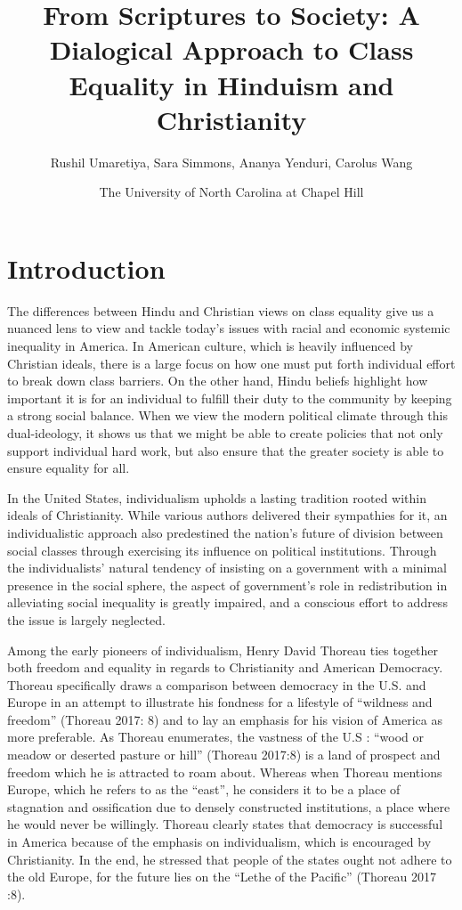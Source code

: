 \documentclass[
	letterpaper, %
	10pt, %
	unnumberedsections, %
	twoside, %
]{LTJournalArticle}
\title{From Scriptures to Society: A Dialogical Approach to Class Equality in Hinduism and Christianity} %
\author{%
	Rushil Umaretiya, Sara Simmons, Ananya Yenduri, Carolus Wang
}
\date{\footnotesize{The University of North Carolina at Chapel Hill}}
\begin{document}
\maketitle %


\section{Introduction}
The differences between Hindu and Christian views on class equality give us a nuanced lens to view and tackle today’s issues with racial and economic systemic inequality in America. In American culture, which is heavily influenced by Christian ideals, there is a large focus on how one must put forth individual effort to break down class barriers. On the other hand, Hindu beliefs highlight how important it is for an individual to fulfill their duty to the community by keeping a strong social balance. When we view the modern political climate through this dual-ideology, it shows us that we might be able to create policies that not only support individual hard work, but also ensure that the greater society is able to ensure equality for all.

In the United States, individualism upholds a lasting tradition rooted within ideals of Christianity. While various authors delivered their sympathies for it, an individualistic approach also predestined the nation’s future of division between social classes through exercising its influence on political institutions. Through the individualists’ natural tendency of insisting on a government with a minimal presence in the social sphere, the aspect of government’s role in redistribution in alleviating social inequality is greatly impaired, and a conscious effort to address the issue is largely neglected.

Among the early pioneers of individualism, Henry David Thoreau ties together both freedom and equality in regards to Christianity and American Democracy. Thoreau specifically draws a comparison between democracy in the U.S. and Europe in an attempt to illustrate his fondness for a lifestyle of “wildness and freedom” (Thoreau 2017: 8) and to lay an emphasis for his vision of America as more preferable. As Thoreau enumerates, the vastness of the U.S : “wood or meadow or deserted pasture or hill” (Thoreau 2017:8) is a land of prospect and freedom which he is attracted to roam about. Whereas when Thoreau mentions Europe, which he refers to as the “east”, he considers it to be a place of stagnation and ossification due to densely constructed institutions, a place where he would never be willingly. Thoreau clearly states that democracy is successful in America because of the emphasis on individualism, which is encouraged by Christianity. In the end, he stressed that people of the states ought not adhere to the old Europe, for the future lies on the “Lethe of the Pacific” (Thoreau 2017 :8).
\end{document}
